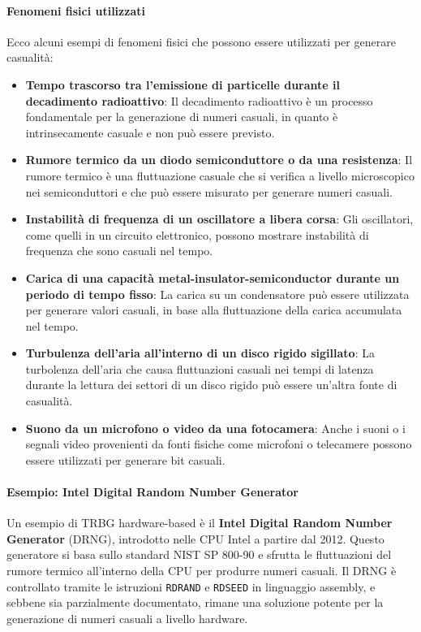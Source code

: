 \documentclass{report}
\begin{document}
\paragraph{Fenomeni fisici utilizzati}
Ecco alcuni esempi di fenomeni fisici che possono essere utilizzati per generare casualità:
\begin{itemize}
    \item \textbf{Tempo trascorso tra l'emissione di particelle durante il decadimento radioattivo}: Il decadimento radioattivo è un processo fondamentale per la generazione di numeri casuali, in quanto è intrinsecamente casuale e non può essere previsto.
    \item \textbf{Rumore termico da un diodo semiconduttore o da una resistenza}: Il rumore termico è una fluttuazione casuale che si verifica a livello microscopico nei semiconduttori e che può essere misurato per generare numeri casuali.
    \item \textbf{Instabilità di frequenza di un oscillatore a libera corsa}: Gli oscillatori, come quelli in un circuito elettronico, possono mostrare instabilità di frequenza che sono casuali nel tempo.
    \item \textbf{Carica di una capacità metal-insulator-semiconductor durante un periodo di tempo fisso}: La carica su un condensatore può essere utilizzata per generare valori casuali, in base alla fluttuazione della carica accumulata nel tempo.
    \item \textbf{Turbulenza dell'aria all'interno di un disco rigido sigillato}: La turbolenza dell'aria che causa fluttuazioni casuali nei tempi di latenza durante la lettura dei settori di un disco rigido può essere un'altra fonte di casualità.
    \item \textbf{Suono da un microfono o video da una fotocamera}: Anche i suoni o i segnali video provenienti da fonti fisiche come microfoni o telecamere possono essere utilizzati per generare bit casuali.
\end{itemize}

\paragraph{Esempio: Intel Digital Random Number Generator}
Un esempio di TRBG hardware-based è il \textbf{Intel Digital Random Number Generator} (DRNG), introdotto nelle CPU Intel a partire dal 2012. Questo generatore si basa sullo standard NIST SP 800-90 e sfrutta le fluttuazioni del rumore termico all'interno della CPU per produrre numeri casuali. Il DRNG è controllato tramite le istruzioni \texttt{RDRAND} e \texttt{RDSEED} in linguaggio assembly, e sebbene sia parzialmente documentato, rimane una soluzione potente per la generazione di numeri casuali a livello hardware.
\end{document}
